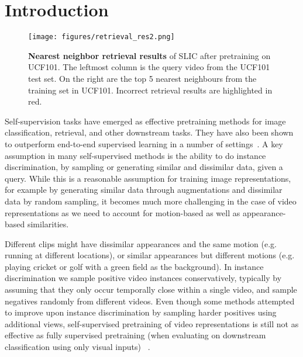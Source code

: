 \documentclass[10pt,twocolumn,letterpaper]{article}
\begin{document}
\section{Introduction}
\label{sec:intro}


\begin{figure}[ht]
	\centering
	
	\texttt{[image: figures/retrieval\_res2.png]}
	\caption{\textbf{Nearest neighbor retrieval results} of SLIC after pretraining on UCF101. The leftmost column is the query video from the UCF101 test set. On the right are the top 5 nearest neighbours from the training set in UCF101. Incorrect retrieval results are highlighted in red.}
	\label{fig:retrieval_results}
	\vspace{-0.3cm}
\end{figure} 




Self-supervision tasks have emerged as effective pretraining methods for image classification, retrieval, and other downstream tasks. They have also been shown to outperform end-to-end supervised learning in a number of settings~\cite{supcon, chen2020simple}. A key assumption in many self-supervised methods is the ability to do instance discrimination, by sampling or generating similar and dissimilar data, given a query. While this is a reasonable assumption for training image representations, for example by generating similar data through augmentations and dissimilar data by random sampling, it becomes much more challenging in the case of video representations as we need to account for motion-based as well as appearance-based similarities.  

Different clips might have dissimilar appearances and the same motion (e.g. running at different locations), or similar appearances but different motions (e.g. playing cricket or golf with a green field as the background). In instance discrimination we sample positive video instances conservatively, typically by assuming that they only occur temporally close within a single video, and sample negatives randomly from different videos. Even though some methods attempted to improve upon instance discrimination by sampling harder positives using additional views, self-supervised pretraining of video representations is still not as effective as fully supervised pretraining (when evaluating on downstream classification using only visual inputs) ~\cite{coclr, xie2018rethinking, tran2018closer}. 
\end{document}
